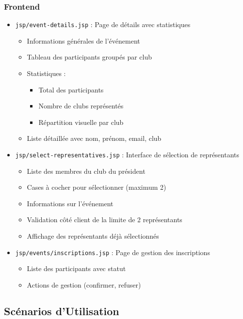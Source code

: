 \documentclass[12pt,a4paper]{article}
\begin{document}
\subsubsection{Frontend}

\begin{itemize}
    \item \texttt{jsp/event-details.jsp} : Page de détails avec statistiques
    \begin{itemize}
        \item Informations générales de l'événement
        \item Tableau des participants groupés par club
        \item Statistiques :
        \begin{itemize}
            \item Total des participants
            \item Nombre de clubs représentés
            \item Répartition visuelle par club
        \end{itemize}
        \item Liste détaillée avec nom, prénom, email, club
    \end{itemize}
    
    \item \texttt{jsp/select-representatives.jsp} : Interface de sélection de représentants
    \begin{itemize}
        \item Liste des membres du club du président
        \item Cases à cocher pour sélectionner (maximum 2)
        \item Informations sur l'événement
        \item Validation côté client de la limite de 2 représentants
        \item Affichage des représentants déjà sélectionnés
    \end{itemize}
    
    \item \texttt{jsp/events/inscriptions.jsp} : Page de gestion des inscriptions
    \begin{itemize}
        \item Liste des participants avec statut
        \item Actions de gestion (confirmer, refuser)
    \end{itemize}
\end{itemize}

\subsection{Scénarios d'Utilisation}
\end{document}
